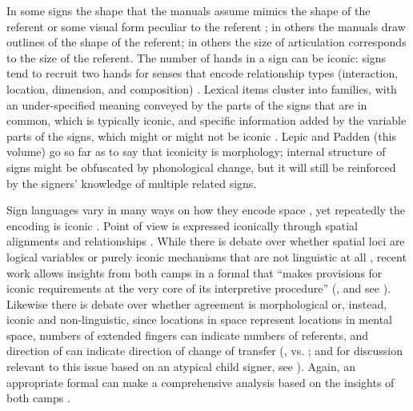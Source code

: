 \documentclass[output=paper,
modfonts
]{LSP/langsci}
\begin{document}
In some signs the shape that the manuals assume mimics the shape of the
referent or some visual form peculiar to the referent \citep{pizzuto1995,pietrandrea2007}; in others the manuals draw outlines
of the shape of the referent; in others the size of articulation
corresponds to the size of the referent. The number of hands in a sign
can be iconic: signs tend to recruit two hands for senses that encode
relationship types (interaction, location, dimension, and composition)
\citep{lepic2016}. Lexical items cluster into families, with an
under-specified meaning conveyed by the parts of the signs that are in
common, which is typically iconic, and specific information added by the
variable parts of the signs, which might or might not be iconic
\citep{fernald2000}. Lepic and Padden (this volume) go so far as
to say that iconicity is morphology; internal structure of signs might
be obfuscated by phonological change, but it will still be reinforced by
the signers' knowledge of multiple related signs.

Sign languages vary in many ways on how they encode space \citep{perniss2015}, yet repeatedly the encoding is iconic \citep{vermeerbergen2006}. Point of view
is expressed iconically through spatial alignments and relationships
\citep{pyers2015}. While there is debate over whether
spatial loci are logical variables \citep{lillo1990,neidle2000} or purely iconic mechanisms that are not linguistic at all
\citep{cuxac1999,liddell2003}, recent work allows insights from both camps
in a formal  that ``makes provisions for iconic requirements at
the very core of its interpretive procedure'' (\citealt[91]{schlenker2013}, and see \citealt{giorgolo2010}). Likewise there is debate over
whether agreement is morphological or, instead, iconic and
non-linguistic, since locations in space represent locations in mental
space, numbers of extended fingers can indicate numbers of referents,
and direction of  can indicate direction of change of transfer
(\citealt{meier1987,janis1995,mathur2000}, vs. \citealt{liddell1995,liddell2003}; and for
discussion relevant to this issue based on an atypical child signer, see
\citealt{quinto2013}). Again, an appropriate formal  can
make a comprehensive analysis based on the insights of both camps
\citep{schlenker2016n}.
\end{document}
